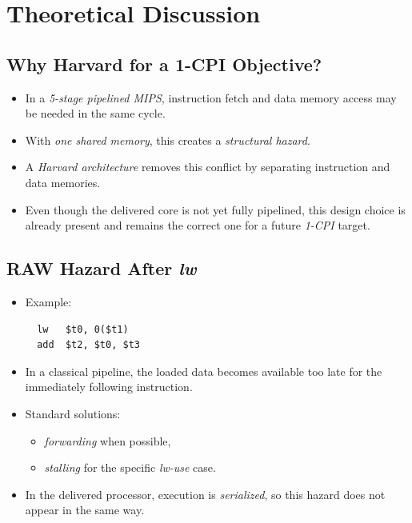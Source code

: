 \documentclass[11pt]{article}
\begin{document}
\section*{Theoretical Discussion}
\label{sec:orgc896e86}
\subsection*{Why Harvard for a 1-CPI Objective?}
\label{sec:org9321f89}
\begin{itemize}
\item In a \emph{5-stage pipelined MIPS}, instruction fetch and data memory access may be needed in the same cycle.
\item With \emph{one shared memory}, this creates a \emph{structural hazard}.
\item A \emph{Harvard architecture} removes this conflict by separating instruction and data memories.
\item Even though the delivered core is not yet fully pipelined, this design choice is already present and remains the correct one for a future \emph{1-CPI} target.
\end{itemize}
\subsection*{RAW Hazard After \emph{lw}}
\label{sec:orge4192ab}
\begin{itemize}
\item Example:
\begin{verbatim}
  lw   $t0, 0($t1)
  add  $t2, $t0, $t3
\end{verbatim}
\item In a classical pipeline, the loaded data becomes available too late for the immediately following instruction.
\item Standard solutions:
\begin{itemize}
\item \emph{forwarding} when possible,
\item \emph{stalling} for the specific \emph{lw-use} case.
\end{itemize}
\item In the delivered processor, execution is \emph{serialized}, so this hazard does not appear in the same way.
\end{itemize}
\end{document}
